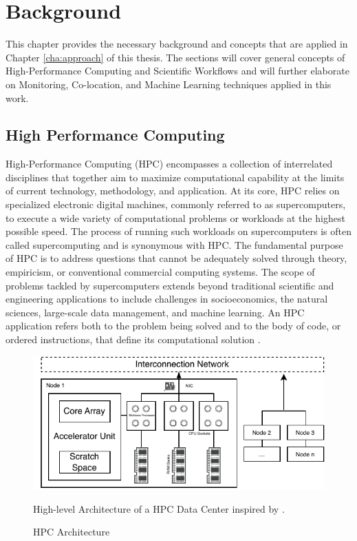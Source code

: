 \section{Background}
\label{cha:background}

This chapter provides the necessary background and concepts that are applied in Chapter \ref{cha:approach} of this thesis. The sections will cover general concepts of High-Performance Computing and Scientific Workflows and will further elaborate on Monitoring, Co-location, and Machine Learning techniques applied in this work.

\subsection{High Performance Computing}
\label{sec:background_hpc}
High-Performance Computing (HPC) encompasses a collection of interrelated disciplines that together aim to maximize computational capability at the limits of current technology, methodology, and application. At its core, HPC relies on specialized electronic digital machines, commonly referred to as supercomputers, to execute a wide variety of computational problems or workloads at the highest possible speed. The process of running such workloads on supercomputers is often called supercomputing and is synonymous with HPC. The fundamental purpose of HPC is to address questions that cannot be adequately solved through theory, empiricism, or conventional commercial computing systems. The scope of problems tackled by supercomputers extends beyond traditional scientific and engineering applications to include challenges in socioeconomics, the natural sciences, large-scale data management, and machine learning. An HPC application refers both to the problem being solved and to the body of code, or ordered instructions, that define its computational solution \cite{STERLING201843}.

\begin{figure}[H]
    \centering
    \includegraphics[scale=1.2]{fig/02/02-hpc-nodes.pdf}
    \small
    \caption{HPC Architecture}
    \label{fig:02-hpc-nodes}
    \tiny
    High-level Architecture of a HPC Data Center inspired by \cite{STERLING201843}.
\end{figure}

